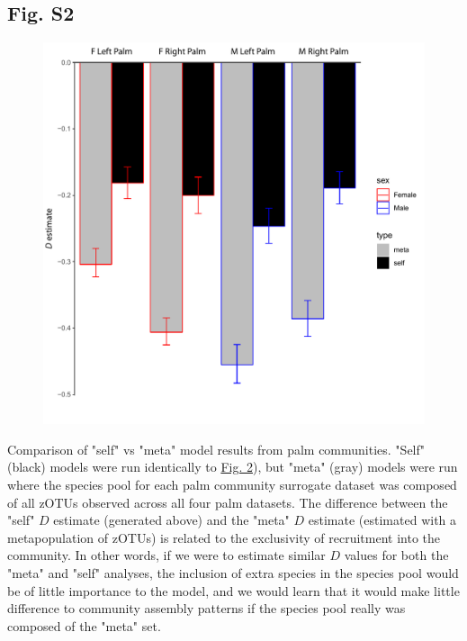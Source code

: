 \documentclass{article}
\begin{document}
{\subsection{Fig. S2}\label{sec:figureS2}
\begin{figure}[ht]
	\centering
	\includegraphics[scale=0.80]{figs/Fig_S2.pdf}
\end{figure}
Comparison of "self" vs "meta" model results from palm communities. "Self" (black) models were run identically to \hyperref[sec:figure2]{Fig. 2}), but "meta" (gray) models were run where the species pool for each palm community surrogate dataset was composed of all zOTUs observed across all four palm datasets. The difference between the "self" \(D\) estimate (generated above) and the "meta" \(D\) estimate (estimated with a metapopulation of zOTUs) is related to the exclusivity of recruitment into the community. In other words, if we were to estimate similar \(D\) values for both the "meta" and "self" analyses, the inclusion of extra species in the species pool would be of little importance to the model, and we would learn that it would make little difference to community assembly patterns if the species pool really was composed of the "meta" set.
\newpage

}
\end{document}

